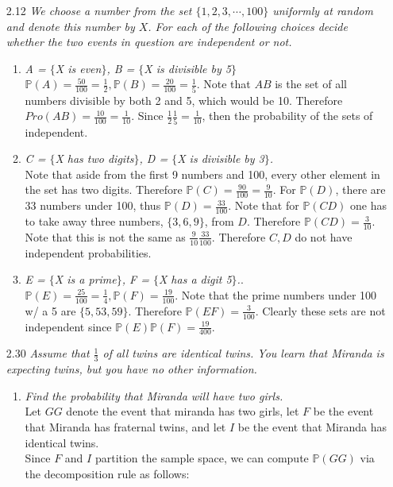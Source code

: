 \documentclass[12pt, letterpaper]{article}
\newcommand{\Pro}{\mathbb{P}}
\begin{document}
\begin{enumerate}
	\item[2.12] \textit{We choose a number from the set $\{1, 2, 3, \cdots, 100\}$ uniformly at
random and denote this number by $X$. For each of the following choices decide
whether the two events in question are independent or not.}
\begin{enumerate}
	\item\textit{A = $\{$X is even$\}$, B = $\{$X is divisible by 5$\}$}\\
	$\Pro(A) = \frac{50}{100} = \frac{1}{2}, \Pro(B) = \frac{20}{100} = \frac{1}{5}$.  Note that $AB$ is the set of all numbers divisible by both 2 and 5, which would be 10.  Therefore $Pro(AB) = \frac{10}{100} = \frac{1}{10}$.  Since $\frac{1}{2}\frac{1}{5} = \frac{1}{10}$, then the probability of the sets of independent.  
	\item \textit{C = $\{$X has two digits$\}$, D = $\{$X is divisible by 3$\}$.}\\
	Note that aside from the first 9 numbers and 100, every other element in the set has two digits.  Therefore $\Pro(C) = \frac{90}{100} = \frac{9}{10}$.
	For $\Pro(D)$, there are $33$ numbers under 100, thus $\Pro(D) = \frac{33}{100}$.  Note that for $\Pro(CD)$ one has to take away three numbers, $\{3,6,9\}$, from $D$.  Therefore $\Pro(CD) = \frac{3}{10}$.
	Note that this is not the same as $\frac{9}{10}\frac{33}{100}$.  Therefore $C,D$ do not have independent probabilities.  
	\item \textit{E = $\{$X is a prime$\}$, F = $\{$X has a digit 5$\}$.}.
	$\Pro(E) = \frac{25}{100} = \frac{1}{4}, \Pro(F) = \frac{19}{100}$.
	Note that the prime numbers under 100 w/ a 5 are $\{5,53,59\}$.
	Therefore $\Pro(EF) = \frac{3}{100}$.  Clearly these sets are not 
	independent since $\Pro(E)\Pro(F) = \frac{19}{400}$.
\end{enumerate}
	\item[2.30] \textit{Assume that $\frac{1}{3}$ of all twins are identical twins. You learn that
Miranda is expecting twins, but you have no other information.}
	\begin{enumerate}
		\item \textit{Find the probability that Miranda will have two girls.}\\
		Let $GG$ denote the event that miranda has two girls, let $F$ be the event that Miranda has fraternal twins, and let $I$ be the event that Miranda has identical twins.  \\
		Since $F$ and $I$ partition the sample space, we can compute $\Pro(GG)$ via the decomposition rule as follows:

\end{enumerate}
\end{enumerate}
\end{document}
